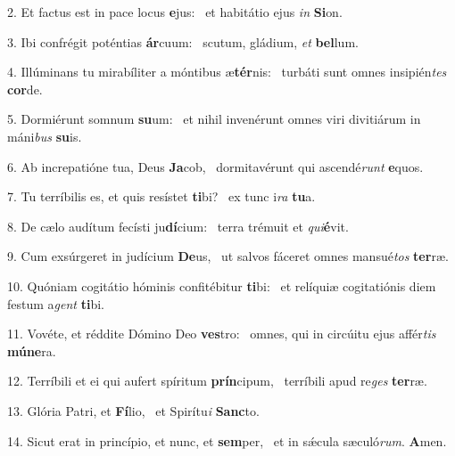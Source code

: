 2. Et factus est in pace locus \textbf{e}jus: \ast\  et habitátio ejus \textit{in} \textbf{Si}on.\

3. Ibi confrégit poténtias \textbf{ár}cuum: \ast\  scutum, gládium, \textit{et} \textbf{bel}lum.\

4. Illúminans tu mirabíliter a móntibus æ\textbf{tér}nis: \ast\  turbáti sunt omnes insipién\textit{tes} \textbf{cor}de.\

5. Dormiérunt somnum \textbf{su}um: \ast\  et nihil invenérunt omnes viri divitiárum in máni\textit{bus} \textbf{su}is.\

6. Ab increpatióne tua, Deus \textbf{Ja}cob, \ast\  dormitavérunt qui ascendé\textit{runt} \textbf{e}quos.\

7. Tu terríbilis es, et quis resístet \textbf{ti}bi? \ast\  ex tunc i\textit{ra} \textbf{tu}a.\

8. De cælo audítum fecísti ju\textbf{dí}cium: \ast\  terra trémuit et \textit{qui}\textbf{é}vit.\

9. Cum exsúrgeret in judícium \textbf{De}us, \ast\  ut salvos fáceret omnes mansué\textit{tos} \textbf{ter}ræ.\

10. Quóniam cogitátio hóminis confitébitur \textbf{ti}bi: \ast\  et relíquiæ cogitatiónis diem festum a\textit{gent} \textbf{ti}bi.\

11. Vovéte, et réddite Dómino Deo \textbf{ves}tro: \ast\  omnes, qui in circúitu ejus affér\textit{tis} \textbf{mú}\textbf{ne}ra.\

12. Terríbili et ei qui aufert spíritum \textbf{prín}cipum, \ast\  terríbili apud re\textit{ges} \textbf{ter}ræ.\

13. Glória Patri, et \textbf{Fí}lio, \ast\  et Spirítu\textit{i} \textbf{Sanc}to.\

14. Sicut erat in princípio, et nunc, et \textbf{sem}per, \ast\  et in sǽcula sæculó\textit{rum}. \textbf{A}men.\

